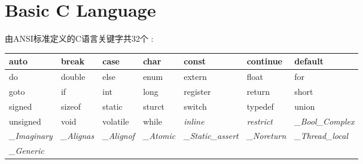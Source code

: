 \chapter{Basic C Language}\label{sec:basic_chapter}

由ANSI标准定义的C语言关键字共32个 :

\begin{table}
\begin{tabular}{|l|l|l|l|l|}
\hline
auto      & break  & case      & char    & const  	   & continue	  & default   \\
\hline
do        & double &  else     & enum    & extern      & float        & for       \\
\hline
goto      & if     & int       & long    & register    &  return      & short     \\
\hline
signed    & sizeof & static    & sturct  & switch      & typedef      & union     \\
\hline
unsigned  & void   & volatile  &  while  & \textit{inline}    & \textit{restrict}     & \textit{_Bool_Complex}   \\
\hline
\textit{_Imaginary} & \textit{_Alignas} & \textit{_Alignof}  & \textit{_Atomic}   & \textit{_Static_assert}  &  \textit{_Noreturn}  & \textit{_Thread_local}     \\
\hline
\textit{_Generic}  & & & & & &  \\
\hline
\end{tabular}
\end{table}




   





